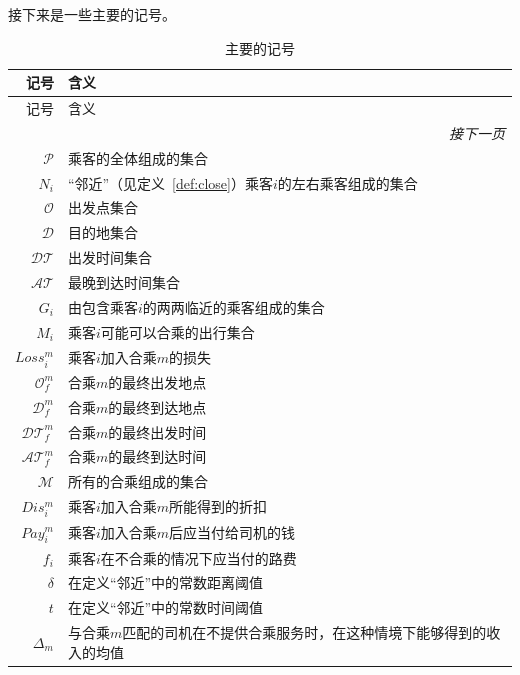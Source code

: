 \par
接下来是一些主要的记号。
\begin{longtable}{|r|l|}
        \caption{主要的记号}
            \label{tab:not}\\	
    \hline
       记号  & 含义 \\
       \endfirsthead
       记号 & 含义 \\
		\hline
		\hline
		\endhead
		\bottomrule \multicolumn{2}{r}{\textit{接下一页}} \\
		\endfoot
		\endlastfoot
       \hline
       \hline
        $\mathcal{P}$ & 乘客的全体组成的集合\\
        \hline
        $N_i$ & “邻近”（见定义~\ref{def:close}）乘客$i$的左右乘客组成的集合\\
        \hline
        $\mathcal{O}$ & 出发点集合\\
        \hline
        $\mathcal{D}$ & 目的地集合\\
        \hline
        $\mathcal{DT}$ & 出发时间集合\\
        \hline
        $\mathcal{AT}$ & 最晚到达时间集合\\
        \hline
        $G_i$ & 由包含乘客$i$的两两临近的乘客组成的集合\\
        \hline
        $M_i$ & 乘客$i$可能可以合乘的出行集合\\
        \hline
        $Loss_i^m$ & 乘客$i$加入合乘$m$的损失\\
        \hline
        $\mathcal{O}_f^m$ & 合乘$m$的最终出发地点\\
        \hline
        $\mathcal{D}_f^m$ & 合乘$m$的最终到达地点\\
        \hline
        $\mathcal{DT}_f^m$ & 合乘$m$的最终出发时间\\
        \hline
        $\mathcal{AT}_f^m$ & 合乘$m$的最终到达时间\\
        \hline
        $\mathcal{M}$ & 所有的合乘组成的集合\\
        \hline
        $Dis_i^m$ & 乘客$i$加入合乘$m$所能得到的折扣\\
        \hline
        $Pay_i^m$ & 乘客$i$加入合乘$m$后应当付给司机的钱\\
        \hline
        $f_i$ & 乘客$i$在不合乘的情况下应当付的路费\\
        \hline
        $\delta$ & 在定义“邻近”中的常数距离阈值\\
        \hline
        $t$ & 在定义“邻近”中的常数时间阈值\\
        \hline
        $\Delta _m$ & 与合乘$m$匹配的司机在不提供合乘服务时，在这种情境下能够得到的收入的均值\\

\end{longtable}
